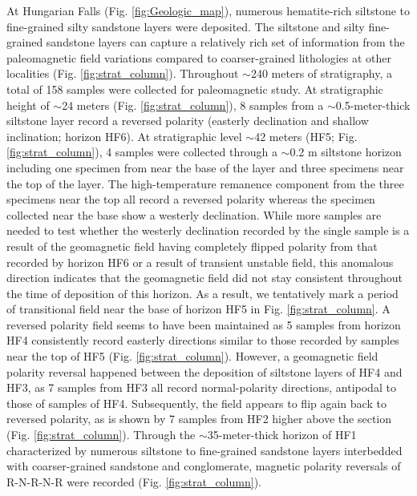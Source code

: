 \documentclass[draft]{agujournal2019}
\begin{document}
At Hungarian Falls (Fig. \ref{fig:Geologic_map}), numerous hematite-rich siltstone to fine-grained silty sandstone layers were deposited. The siltstone and silty fine-grained sandstone layers can capture a relatively rich set of information from the paleomagnetic field variations compared to coarser-grained lithologies at other localities (Fig. \ref{fig:strat_column}). Throughout $\sim$240 meters of stratigraphy, a total of 158 samples were collected for paleomagnetic study. At stratigraphic height of $\sim$24 meters (Fig. \ref{fig:strat_column}), 8 samples from a $\sim$0.5-meter-thick siltstone layer record a reversed polarity (easterly declination and shallow inclination; horizon HF6). At stratigraphic level $\sim$42 meters (HF5; Fig. \ref{fig:strat_column}), 4 samples were collected through a $\sim$0.2 m siltstone horizon including one specimen from near the base of the layer and three specimens near the top of the layer. The high-temperature remanence component from the three specimens near the top all record a reversed polarity whereas the specimen collected near the base show a westerly declination. While more samples are needed to test whether the westerly declination recorded by the single sample is a result of the geomagnetic field having completely flipped polarity from that recorded by horizon HF6 or a result of transient unstable field, this anomalous direction indicates that the geomagnetic field did not stay consistent throughout the time of deposition of this horizon. As a result, we tentatively mark a period of transitional field near the base of horizon HF5 in Fig. \ref{fig:strat_column}. A reversed polarity field seems to have been maintained as 5 samples from horizon HF4 consistently record easterly directions similar to those recorded by samples near the top of HF5 (Fig. \ref{fig:strat_column}). However, a geomagnetic field polarity reversal happened between the deposition of siltstone layers of HF4 and HF3, as 7 samples from HF3 all record normal-polarity directions, antipodal to those of samples of HF4. Subsequently, the field appears to flip again back to reversed polarity, as is shown by 7 samples from HF2 higher above the section (Fig. \ref{fig:strat_column}). Through the $\sim$35-meter-thick horizon of HF1 characterized by numerous siltstone to fine-grained sandstone layers interbedded with coarser-grained sandstone and conglomerate, magnetic polarity reversals of R-N-R-N-R were recorded (Fig. \ref{fig:strat_column}). 
\end{document}
